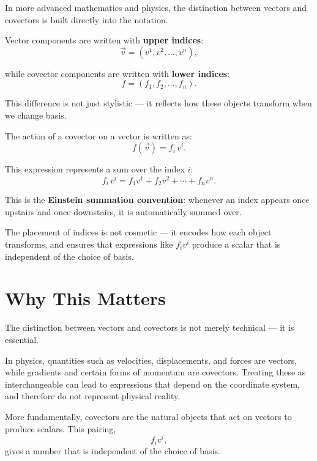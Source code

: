 \documentclass[11pt,openany]{book}
\theoremstyle{definition}
\begin{document}
In more advanced mathematics and physics, the distinction between vectors and
covectors is built directly into the notation.

\medskip

Vector components are written with \textbf{upper indices}:
\[
\vec{v} = (v^1, v^2, \ldots, v^n),
\]

while covector components are written with \textbf{lower indices}:
\[
f = (f_1, f_2, \ldots, f_n).
\]

\medskip

This difference is not just stylistic --- it reflects how these objects transform
when we change basis.

\medskip

The action of a covector on a vector is written as:
\[
f(\vec{v}) = f_i\, v^i.
\]

\medskip

This expression represents a sum over the index $i$:
\[
f_i\, v^i = f_1 v^1 + f_2 v^2 + \cdots + f_n v^n.
\]

\medskip

This is the \textbf{Einstein summation convention}: whenever an index appears
once upstairs and once downstairs, it is automatically summed over.

\medskip

\begin{keyidea} The placement of indices is not cosmetic --- it encodes how
each object transforms, and ensures that expressions like $f_i v^i$ produce a
scalar that is independent of the choice of basis.
\end{keyidea}
\section{Why This Matters}

The distinction between vectors and covectors is not merely technical --- it is
essential.

\medskip

In physics, quantities such as velocities, displacements, and forces are vectors,
while gradients and certain forms of momentum are covectors. Treating these as
interchangeable can lead to expressions that depend on the coordinate system, and
therefore do not represent physical reality.

\medskip

More fundamentally, covectors are the natural objects that act on vectors to
produce scalars. This pairing,
\[
f_i v^i,
\]
gives a number that is independent of the choice of basis.
\end{document}
